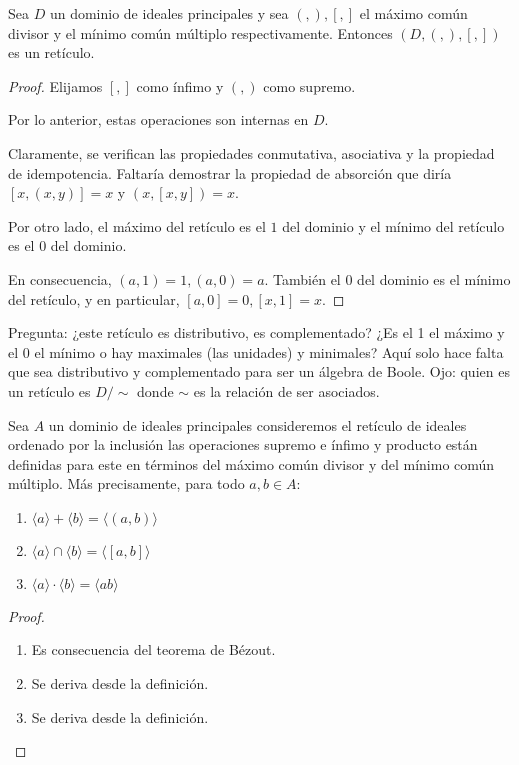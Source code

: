 \begin{corollary}
Sea $D$ un dominio de ideales principales y sea $(,),[,]$ el máximo común divisor y el mínimo común múltiplo respectivamente. Entonces $(D,(,),[,])$ es un retículo.
\end{corollary}
\begin{proof}
Elijamos $[,]$ como ínfimo y $(,)$ como supremo. 

Por lo anterior, estas operaciones son internas en $D$. 

Claramente, se verifican las propiedades conmutativa, asociativa y la propiedad de idempotencia. Faltaría demostrar la propiedad de absorción que diría $[x,(x,y)] = x$ y $(x,[x,y]) = x$. 

Por otro lado, el máximo del retículo es el $1$ del dominio y el mínimo del retículo es el $0$ del dominio.

En consecuencia, $(a,1) = 1,(a,0) = a$. También el $0$ del dominio es el mínimo del retículo, y en particular, $[a,0] = 0,[x,1] = x$.
\end{proof}



Pregunta: ¿este retículo es distributivo, es complementado? ¿Es el 1 el máximo y el 0 el mínimo o hay maximales (las unidades) y minimales? Aquí solo hace falta que sea distributivo y complementado para ser un álgebra de Boole. Ojo: quien es un retículo es $D/\sim$ donde $\sim$ es la relación de ser asociados. 

\begin{corollary}
Sea $A$ un dominio de ideales principales consideremos el retículo de ideales ordenado por la inclusión las operaciones supremo e ínfimo y producto están definidas para este en términos del máximo común divisor y del mínimo común múltiplo. Más precisamente, para todo $a,b \in A$:

\begin{enumerate}
\item $\langle a \rangle + \langle b \rangle = \langle (a,b) \rangle$
\item $\langle a \rangle \cap \langle b \rangle = \langle [a,b] \rangle$
\item $\langle a \rangle \cdot \langle b \rangle = \langle ab \rangle$
\end{enumerate}
\end{corollary}
\begin{proof}
\begin{enumerate}
\item Es consecuencia del teorema de Bézout. 
\item Se deriva desde la definición. 
\item Se deriva desde la definición. 
\end{enumerate}
\end{proof}

